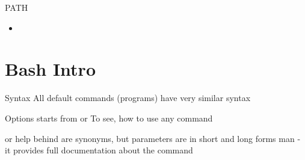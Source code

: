 \documentclass[usenames,dvipsnames,10pt,aspectratio=169]{beamer}
\begin{document}
\begin{frame}{PATH}
    \begin{itemize}
        \item 
    \end{itemize}
\end{frame}

\section{Bash Intro}

\begin{frame}{Syntax}
    All default commands (programs) have very similar syntax
    \begin{examples}
    \end{examples}
    Options starts from \ex{-} or \ex{-{}-} \newline
    To see, how to use any command
    \begin{examples}
         \newline or
        help \newline behind are synonyms, but parameters are in short and long forms \newline
        man   - it provides full documentation about the command
    \end{examples}
\end{frame}
\end{document}
